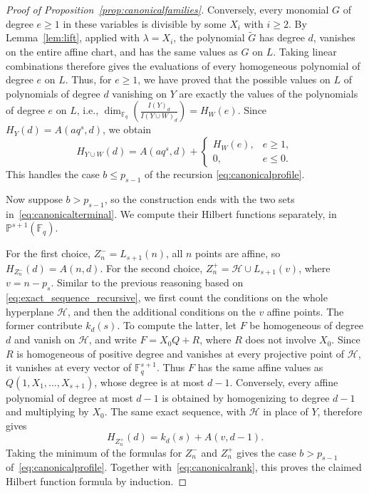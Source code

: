 \documentclass[11pt]{amsart}
\theoremstyle{definition}
\newcommand{\F}{\mathbb F}
\newcommand{\PP}{\mathbb P}
\numberwithin{equation}{section}
\begin{document}
\begin{proof}[Proof of Proposition~\ref{prop:canonicalfamilies}]
Conversely, every monomial $G$ of degree $e\ge1$ in these
variables is divisible by some $X_i$ with $i\ge2$. By
Lemma~\ref{lem:lift}, applied with $\lambda=X_i$, the polynomial
$\tilde{G}$ has degree $d$, vanishes on the entire affine chart, and
has the same values as $G$ on $L$.
Taking linear combinations therefore gives the evaluations
of every homogeneous polynomial of degree $e$ on $L$. Thus, for $e\ge1$, we have proved that the possible values on $L$ of polynomials of degree $d$ vanishing on $Y$ are exactly the values of the polynomials of degree $e$ on $L$, i.e., $\dim_{\F_q}\left(\frac{I(Y)_d}{I(Y\cup W)_d}\right)=H_W(e)$.
Since $H_Y(d)=A(aq^s,d)$, we obtain
\begin{equation}\label{eq:canonicalrank}
 H_{Y\cup W}(d)=A(aq^s,d)+
 \begin{cases}
 H_W(e),&e\ge1,\\
 0,&e\le0.
 \end{cases}
\end{equation}
This handles the case $b\leq p_{s-1}$ of the recursion \eqref{eq:canonicalprofile}.

Now suppose $b>p_{s-1}$, so the construction ends with the two
sets in~\eqref{eq:canonicalterminal}.
We compute their Hilbert functions separately, in $\PP^{s+1}(\F_q)$.

For the first choice, $Z_n^-=L_{s+1}(n)$, all $n$ points
are affine, so $H_{Z_n^-}(d)=A(n,d)$.
For the second choice, $Z_n^+=\mathcal H\cup L_{s+1}(v)$, where
\(
 v=n-p_s.
\)
Similar to the previous reasoning based on \eqref{eq:exact_sequence_recursive}, we first count the conditions on the whole hyperplane $\mathcal H$,
and then the additional conditions on the $v$ affine points.
The former contribute $k_d(s)$. To compute the latter, let
$F$ be homogeneous of degree $d$ and vanish on $\mathcal H$, and write
$F=X_0Q+R$, where $R$ does not involve $X_0$.
Since $R$ is homogeneous of positive degree and vanishes at
every projective point of $\mathcal H$, it vanishes at every vector
of $\F_q^{s+1}$.
Thus $F$ has the same affine values as $Q(1,X_1,\ldots,X_{s+1})$,
whose degree is at most $d-1$. Conversely, every affine
polynomial of degree at most $d-1$ is obtained by homogenizing
to degree $d-1$ and multiplying by $X_0$.
The same exact sequence, with $\mathcal H$ in place of $Y$, therefore gives
\[
 H_{Z_n^+}(d)=k_d(s)+A(v,d-1).
\]
Taking the minimum of the formulas for $Z_n^-$ and $Z_n^+$
gives the case $b>p_{s-1}$ of~\eqref{eq:canonicalprofile}.
Together with~\eqref{eq:canonicalrank}, this proves the
claimed Hilbert function formula by induction.
\end{proof}
\end{document}
